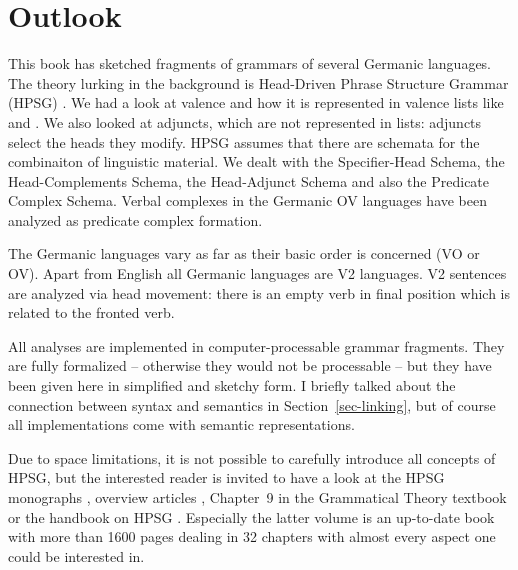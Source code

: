 
\chapter{Outlook}
\label{chap-outlook}

This book has sketched fragments of grammars of several Germanic languages. The theory lurking in the
background is Head-Driven Phrase Structure Grammar (HPSG)
\parencites{ps}{ps2}{MuellerLehrbuch3}{HPSGHandbook}. We had a look at valence and how it is
represented in valence lists like \spr and \comps. We also looked at adjuncts, which are not
represented in lists: adjuncts select the heads they modify. HPSG assumes that there are schemata
for the combinaiton of linguistic material. We dealt with the Specifier-Head Schema, the
Head-Complements Schema, the Head-Adjunct Schema and also the Predicate Complex Schema. Verbal
complexes in the Germanic OV languages have been analyzed as predicate complex formation.

The Germanic languages vary as far as their basic order is concerned (VO or OV). Apart from English
all Germanic languages are V2 languages. V2 sentences are analyzed via head movement: there is an
empty verb in final position which is related to the fronted verb.

All analyses are implemented in computer-processable grammar fragments. They are fully formalized –
otherwise they would not be processable – but they have been given here in simplified and sketchy
form. I briefly talked about the connection between syntax and semantics in Section~\ref{sec-linking}, but of
course all implementations come with semantic representations.

Due to space limitations, it is not possible to carefully introduce all concepts of HPSG, but the
interested reader is invited to have a look at the HPSG monographs
\parencites{ps}{ps2}{GSag2000a-u}{MuellerLehrbuch3}, overview articles
\parencites{LM2006a}{PK2006a-u}{Bildhauer2014a-u}{MuellerHPSGHandbook,MuellerCurrentApproaches}, Chapter~9 in
the Grammatical Theory textbook \citep{MuellerGT-Eng4} or the handbook on HPSG
\citep{HPSGHandbook}. Especially the latter volume is an up-to-date book with more than 1600 pages
dealing in 32 chapters with almost every aspect one could be interested in.







